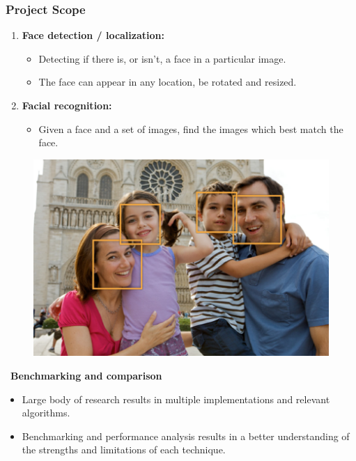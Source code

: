 \documentclass{beamer}
\begin{document}
\begin{frame}[t]\frametitle{Project Scope}
    
\begin{minipage}[t]{0.55\linewidth}
    \begin{enumerate}
      \item \textbf{Face detection / localization:} 
      \begin{itemize}
          \item Detecting if there is, or isn't, a face in a particular image.
          \item The face can appear in any location, be rotated and resized.
      \end{itemize}

      \item \textbf{Facial recognition:} 
      \begin{itemize}
          \item Given a face and a set of images, find the images which best match the face.

      \end{itemize}
    \end{enumerate}
\end{minipage}
\begin{minipage}[t]{0.35\linewidth}
    \begin{figure}
    \includegraphics[width=\linewidth]{detect.png}
    \end{figure}
\end{minipage}

\,
\textbf{Benchmarking and comparison}
\begin{itemize}
    \item Large body of research results in multiple implementations and relevant algorithms. 
    \item Benchmarking and performance analysis results in a better understanding of the strengths and limitations of each technique.
\end{itemize}
    
\end{frame}
\end{document}
